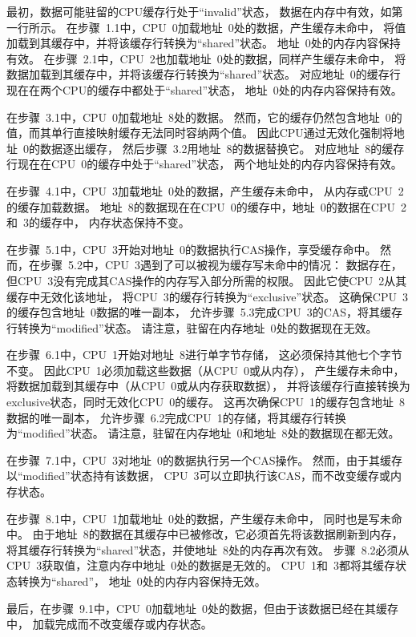 最初，数据可能驻留的CPU缓存行处于``invalid''状态，
数据在内存中有效，如第一行所示。
在步骤~1.1中，CPU~0加载地址~0处的数据，产生缓存未命中，
将值加载到其缓存中，并将该缓存行转换为``shared''状态。
地址~0处的内存内容保持有效。
在步骤~2.1中，CPU~2也加载地址~0处的数据，同样产生缓存未命中，
将数据加载到其缓存中，并将该缓存行转换为``shared''状态。
对应地址~0的缓存行现在在两个CPU的缓存中都处于``shared''状态，
地址~0处的内存内容保持有效。

在步骤~3.1中，CPU~0加载地址~8处的数据。
然而，它的缓存仍然包含地址~0的值，而其单行直接映射缓存无法同时容纳两个值。
因此CPU通过无效化强制将地址~0的数据逐出缓存，
然后步骤~3.2用地址~8的数据替换它。
对应地址~8的缓存行现在在CPU~0的缓存中处于``shared''状态，
两个地址处的内存内容保持有效。

在步骤~4.1中，CPU~3加载地址~0处的数据，产生缓存未命中，
从内存或CPU~2的缓存加载数据。
地址~8的数据现在在CPU~0的缓存中，地址~0的数据在CPU~2和~3的缓存中，
内存状态保持不变。

在步骤~5.1中，CPU~3开始对地址~0的数据执行CAS操作，享受缓存命中。
然而，在步骤~5.2中，CPU~3遇到了可以被视为缓存写未命中的情况：
数据存在，但CPU~3没有完成其CAS操作的内存写入部分所需的权限。
因此它使CPU~2从其缓存中无效化该地址，
将CPU~3的缓存行转换为``exclusive''状态。
这确保CPU~3的缓存包含地址~0数据的唯一副本，
允许步骤~5.3完成CPU~3的CAS，将其缓存行转换为``modified''状态。
请注意，驻留在内存地址~0处的数据现在无效。

在步骤~6.1中，CPU~1开始对地址~8进行单字节存储，
这必须保持其他七个字节不变。
因此CPU~1必须加载这些数据（从CPU~0或从内存），
产生缓存未命中，将数据加载到其缓存中（从CPU~0或从内存获取数据），
并将该缓存行直接转换为exclusive状态，同时无效化CPU~0的缓存。
这再次确保CPU~1的缓存包含地址~8数据的唯一副本，
允许步骤~6.2完成CPU~1的存储，将其缓存行转换为``modified''状态。
请注意，驻留在内存地址~0和地址~8处的数据现在都无效。

在步骤~7.1中，CPU~3对地址~0的数据执行另一个CAS操作。
然而，由于其缓存以``modified''状态持有该数据，
CPU~3可以立即执行该CAS，而不改变缓存或内存状态。

在步骤~8.1中，CPU~1加载地址~0处的数据，产生缓存未命中，
同时也是写未命中。
由于地址~8的数据在其缓存中已被修改，它必须首先将该数据刷新到内存，
将其缓存行转换为``shared''状态，并使地址~8处的内存再次有效。
步骤~8.2必须从CPU~3获取值，注意内存中地址~0处的数据是无效的。
CPU~1和~3都将其缓存状态转换为``shared''，
地址~0处的内存内容保持无效。

最后，在步骤~9.1中，CPU~0加载地址~0处的数据，但由于该数据已经在其缓存中，
加载完成而不改变缓存或内存状态。


